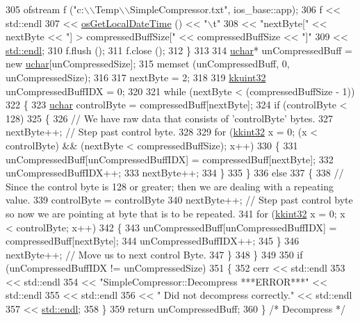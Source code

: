 \begin{DoxyCode}
305     ofstream  f (\textcolor{stringliteral}{"c:\(\backslash\)\(\backslash\)Temp\(\backslash\)\(\backslash\)SimpleCompressor.txt"}, ios\_base::app);
306     f << std::endl
307       << \hyperlink{namespace_k_k_b_af54c205cde0465bcb2c74f3881a96413}{osGetLocalDateTime} ()  << \textcolor{stringliteral}{"\(\backslash\)t"}
308       << \textcolor{stringliteral}{"nextByte["} <<  nextByte << \textcolor{stringliteral}{"] > compressedBuffSize["} << compressedBuffSize << \textcolor{stringliteral}{"]"}
309       << \hyperlink{namespace_k_k_b_ad1f50f65af6adc8fa9e6f62d007818a8}{std::endl};
310     f.flush ();
311     f.close ();
312   \}
313 
314   \hyperlink{namespace_k_k_b_ace9969169bf514f9ee6185186949cdf7}{uchar}*  unCompressedBuff = \textcolor{keyword}{new} \hyperlink{namespace_k_k_b_ace9969169bf514f9ee6185186949cdf7}{uchar}[unCompressedSize];
315   memset (unCompressedBuff, 0, unCompressedSize);
316 
317   nextByte = 2;
318 
319   \hyperlink{namespace_k_k_b_af8d832f05c54994a1cce25bd5743e19a}{kkuint32}  unCompressedBuffIDX = 0;
320 
321   \textcolor{keywordflow}{while}  (nextByte < (compressedBuffSize - 1))
322   \{
323     \hyperlink{namespace_k_k_b_ace9969169bf514f9ee6185186949cdf7}{uchar}  controlByte = compressedBuff[nextByte];
324     \textcolor{keywordflow}{if}  (controlByte < 128)
325     \{
326       \textcolor{comment}{// We have raw data that consists of 'controlByte' bytes.}
327       nextByte++;  \textcolor{comment}{// Step past control byte.}
328 
329       \textcolor{keywordflow}{for}  (\hyperlink{namespace_k_k_b_a8fa4952cc84fda1de4bec1fbdd8d5b1b}{kkint32} x = 0;  (x < controlByte)   &&  (nextByte < compressedBuffSize);  x++)
330       \{
331         unCompressedBuff[unCompressedBuffIDX] = compressedBuff[nextByte];
332         unCompressedBuffIDX++;
333         nextByte++;
334       \}
335     \}
336     \textcolor{keywordflow}{else}
337     \{
338       \textcolor{comment}{// Since the control byte is 128 or greater;  then we are dealing with a repeating value.}
339       controlByte = controlByte %
340       nextByte++;  \textcolor{comment}{// Step past control byte so now we are pointing at byte that is to be repeated.}
341       \textcolor{keywordflow}{for}  (\hyperlink{namespace_k_k_b_a8fa4952cc84fda1de4bec1fbdd8d5b1b}{kkint32} x = 0;  x < controlByte;  x++)
342       \{
343         unCompressedBuff[unCompressedBuffIDX] = compressedBuff[nextByte];
344         unCompressedBuffIDX++;
345       \}
346       nextByte++;  \textcolor{comment}{// Move us to next control Byte.}
347     \}
348   \}
349 
350   \textcolor{keywordflow}{if}  (unCompressedBuffIDX != unCompressedSize)
351   \{
352     cerr << std::endl
353          << std::endl
354          << \textcolor{stringliteral}{"SimpleCompressor::Decompress     ***ERROR***"} << std::endl
355          << std::endl
356          << \textcolor{stringliteral}{"                       Did not decompress correctly."} << std::endl
357          << \hyperlink{namespace_k_k_b_ad1f50f65af6adc8fa9e6f62d007818a8}{std::endl};
358   \}
359   \textcolor{keywordflow}{return}  unCompressedBuff;
360 \}  \textcolor{comment}{/* Decompress */}
\end{DoxyCode}


